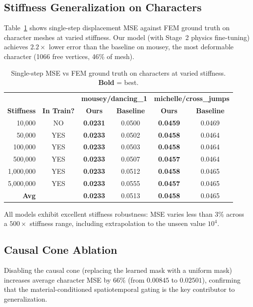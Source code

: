 \documentclass[10pt,twocolumn]{article}
\begin{document}
\subsection{Stiffness Generalization on Characters}

Table~\ref{tab:fem_main} shows single-step displacement MSE against FEM ground truth on character meshes at varied stiffness. Our model (with Stage~2 physics fine-tuning) achieves $2.2\times$ lower error than the baseline on mousey, the most deformable character (1066 free vertices, 46\% of mesh).

\begin{table}[h]
\centering
\caption{Single-step MSE vs FEM ground truth on characters at varied stiffness. \textbf{Bold} = best.}
\label{tab:fem_main}
\small
\begin{tabular}{rc|cc|cc}
\toprule
& & \multicolumn{2}{c|}{\textbf{mousey/dancing\_1}} & \multicolumn{2}{c}{\textbf{michelle/cross\_jumps}} \\
\textbf{Stiffness} & \textbf{In Train?} & \textbf{Ours} & \textbf{Baseline} & \textbf{Ours} & \textbf{Baseline} \\
\midrule
10,000 & NO & \textbf{0.0231} & 0.0500 & \textbf{0.0459} & 0.0469 \\
50,000 & YES & \textbf{0.0233} & 0.0502 & \textbf{0.0458} & 0.0464 \\
100,000 & YES & \textbf{0.0233} & 0.0503 & \textbf{0.0458} & 0.0464 \\
500,000 & YES & \textbf{0.0233} & 0.0507 & \textbf{0.0457} & 0.0464 \\
1,000,000 & YES & \textbf{0.0233} & 0.0512 & \textbf{0.0458} & 0.0465 \\
5,000,000 & YES & \textbf{0.0233} & 0.0555 & \textbf{0.0457} & 0.0465 \\
\midrule
\textbf{Avg} & & \textbf{0.0233} & 0.0513 & \textbf{0.0458} & 0.0465 \\
\bottomrule
\end{tabular}
\end{table}

All models exhibit excellent stiffness robustness: MSE varies less than 3\% across a $500\times$ stiffness range, including extrapolation to the unseen value $10^4$.

\subsection{Causal Cone Ablation}

Disabling the causal cone (replacing the learned mask with a uniform mask) increases average character MSE by $66\%$ (from $0.00845$ to $0.02501$), confirming that the material-conditioned spatiotemporal gating is the key contributor to generalization.
\end{document}

